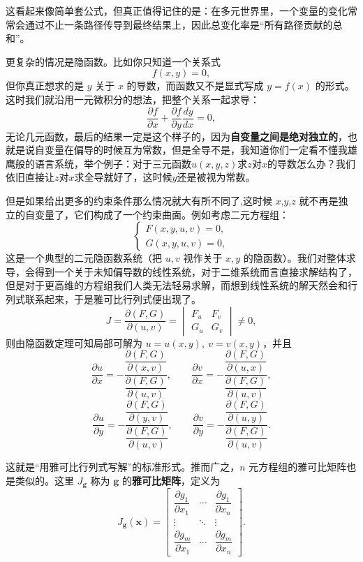\documentclass[UTF8]{ctexbook}
\begin{document}
这看起来像简单套公式，但真正值得记住的是：在多元世界里，一个变量的变化常常会通过不止一条路径传导到最终结果上，因此总变化率是“所有路径贡献的总和”。

更复杂的情况是隐函数。比如你只知道一个关系式
\[
f(x,y)=0,
\]
但你真正想求的是 $y$ 关于 $x$ 的导数，而函数又不是显式写成 $y=f(x)$ 的形式。这时我们就沿用一元微积分的想法，把整个关系一起求导：
\[
\frac{\partial f}{\partial x}+\frac{\partial f}{\partial y}\frac{dy}{dx}=0,
\]
无论几元函数，最后的结果一定是这个样子的，因为\textbf{自变量之间是绝对独立的}，也就是说自变量在偏导的时候互为常数，但是全导不是，我知道你们一定看不懂我雄鹰般的语言系统，举个例子：对于三元函数$u(x,y,z)$求$z$对$x$的导数怎么办？我们依旧直接让$z$对$x$求全导就好了，这时候$y$还是被视为常数。

但是如果给出更多的约束条件那么情况就大有所不同了,这时候 $x$,$y$,$z$ 就不再是独立的自变量了，它们构成了一个约束曲面。例如考虑二元方程组：
\[
\begin{cases}
F(x,y,u,v)=0,\\
G(x,y,u,v)=0,
\end{cases}
\]
这是一个典型的二元隐函数系统（把 $u,v$ 视作关于 $x,y$ 的隐函数）。我们对整体求导，会得到一个关于未知偏导数的线性系统，对于二维系统而言直接求解结构了，但是对于更高维的方程组我们人类无法轻易求解，而想到线性系统的解天然会和行列式联系起来，于是雅可比行列式便出现了。
\[
J=\frac{\partial(F,G)}{\partial(u,v)}
=\begin{vmatrix}
F_u & F_v\\
G_u & G_v
\end{vmatrix}\neq 0,
\]
则由隐函数定理可知局部可解为 $u=u(x,y),\ v=v(x,y)$，并且
\[
\frac{\partial u}{\partial x}
=-\frac{\dfrac{\partial(F,G)}{\partial(x,v)}}{\dfrac{\partial(F,G)}{\partial(u,v)}},
\qquad
\frac{\partial v}{\partial x}
=-\frac{\dfrac{\partial(F,G)}{\partial(u,x)}}{\dfrac{\partial(F,G)}{\partial(u,v)}},
\]
\[
\frac{\partial u}{\partial y}
=-\frac{\dfrac{\partial(F,G)}{\partial(y,v)}}{\dfrac{\partial(F,G)}{\partial(u,v)}},
\qquad
\frac{\partial v}{\partial y}
=-\frac{\dfrac{\partial(F,G)}{\partial(u,y)}}{\dfrac{\partial(F,G)}{\partial(u,v)}}.
\]

这就是“用雅可比行列式写解”的标准形式。推而广之，$n$ 元方程组的雅可比矩阵也是类似的。这里 $J_{\mathbf{g}}$ 称为 $\mathbf{g}$ 的\textbf{雅可比矩阵}，定义为
\[
J_{\mathbf{g}}(\mathbf{x})=
\begin{bmatrix}
\dfrac{\partial g_1}{\partial x_1} & \cdots & \dfrac{\partial g_1}{\partial x_n}\\
\vdots & \ddots & \vdots\\
\dfrac{\partial g_m}{\partial x_1} & \cdots & \dfrac{\partial g_m}{\partial x_n}
\end{bmatrix}.
\]
\end{document}
